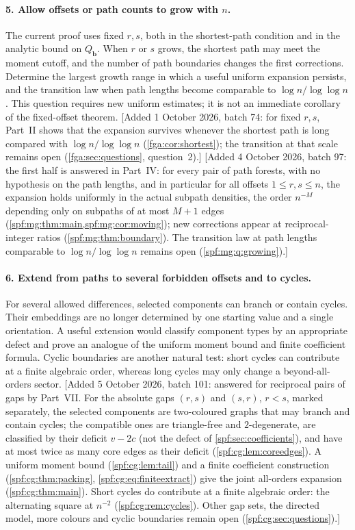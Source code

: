\documentclass[11pt]{article}
\numberwithin{equation}{section}
\theoremstyle{definition}
\theoremstyle{remark}
\theoremstyle{definition}
\begin{document}
\paragraph{5. Allow offsets or path counts to grow with $n$.}
The current proof uses fixed $r,s$, both in the shortest-path condition and in
the analytic bound on $Q_{\mathbf b}$. When $r$ or $s$ grows, the shortest path
may meet the moment cutoff, and the number of path boundaries changes the
first corrections. Determine the largest growth range in which a useful
uniform expansion persists, and the transition law when path lengths become
comparable to $\log n/\log\log n$. This question requires new uniform estimates;
it is not an immediate corollary of the fixed-offset theorem.
[Added 1 October 2026, batch 74: for fixed $r,s$, Part~II shows that the
expansion survives whenever the shortest path is long compared with
$\log n/\log\log n$ (\cref{fga:cor:shortest}); the transition at that scale
remains open (\cref{fga:sec:questions}, question~2).]
[Added 4 October 2026, batch 97: the first half is answered in Part~IV: for
every pair of path forests, with no hypothesis on the path lengths, and in
particular for all offsets $1\le r,s\le n$, the expansion holds uniformly in
the actual subpath densities, the order $n^{-M}$ depending only on subpaths
of at most $M+1$ edges (\cref{spf:mg:thm:main,spf:mg:cor:moving}); new
corrections appear at reciprocal-integer ratios
(\cref{spf:mg:thm:boundary}). The transition law at path lengths comparable
to $\log n/\log\log n$ remains open (\cref{spf:mg:q:growing}).]

\paragraph{6. Extend from paths to several forbidden offsets and to cycles.}
For several allowed differences, selected components can branch or contain
cycles. Their embeddings are no longer determined by one starting value and a
single orientation. A useful extension would classify component types by an
appropriate defect and prove an analogue of the uniform moment bound and
finite coefficient formula. Cyclic boundaries are another natural test:
short cycles can contribute at a finite algebraic order, whereas long cycles
may only change a beyond-all-orders sector.
[Added 5 October 2026, batch 101: answered for reciprocal pairs of gaps by
Part~VII. For the absolute gaps $(r,s)$ and $(s,r)$, $r<s$, marked
separately, the selected components are two-coloured graphs that may
branch and contain cycles; the compatible ones are triangle-free and
$2$-degenerate, are classified by their deficit $v-2c$ (not the defect of
\cref{spf:sec:coefficients}), and have at most twice as many core edges as
their deficit (\cref{spf:cg:lem:coreedges}). A uniform moment bound
(\cref{spf:cg:lem:tail}) and a finite coefficient construction
(\cref{spf:cg:thm:packing}, \eqref{spf:cg:eq:finiteextract}) give the joint
all-orders expansion (\cref{spf:cg:thm:main}). Short cycles do contribute at
a finite algebraic order: the alternating square at $n^{-2}$
(\cref{spf:cg:rem:cycles}). Other gap sets, the directed model, more colours
and cyclic boundaries remain open (\cref{spf:cg:sec:questions}).]
\end{document}
